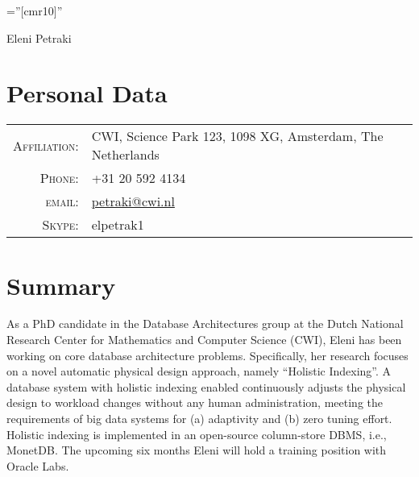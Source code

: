\documentclass[a4paper,10pt]{article}
\begin{document}

\pagestyle{empty} %

\font\fb=''[cmr10]'' %

\par{\centering
		{\Huge Eleni Petraki
	}\bigskip\par}

\section{Personal Data}

\begin{tabular}{rl}
    \textsc{Affiliation:}   & CWI, Science Park 123, 1098 XG, Amsterdam, The Netherlands \\
    \textsc{Phone:}     & +31 20 592 4134\\
    \textsc{email:}     & \href{mailto:petraki@cwi.nl}{petraki@cwi.nl}\\
    \textsc{Skype:}     & elpetrak1\\
\end{tabular}

\section{Summary}
As a PhD candidate in the Database Architectures group at the Dutch National Research Center for Mathematics and Computer Science (CWI), Eleni has been working on core database architecture problems. Specifically, her research focuses on a novel automatic physical design approach, namely ``Holistic Indexing''. A database system with holistic indexing enabled continuously adjusts the physical design to workload changes without any human administration, meeting the requirements of big data systems for (a) adaptivity and (b) zero tuning effort. Holistic indexing is implemented in an open-source column-store DBMS, i.e., MonetDB. The upcoming six months Eleni will hold a training position with Oracle Labs.
\end{document}
